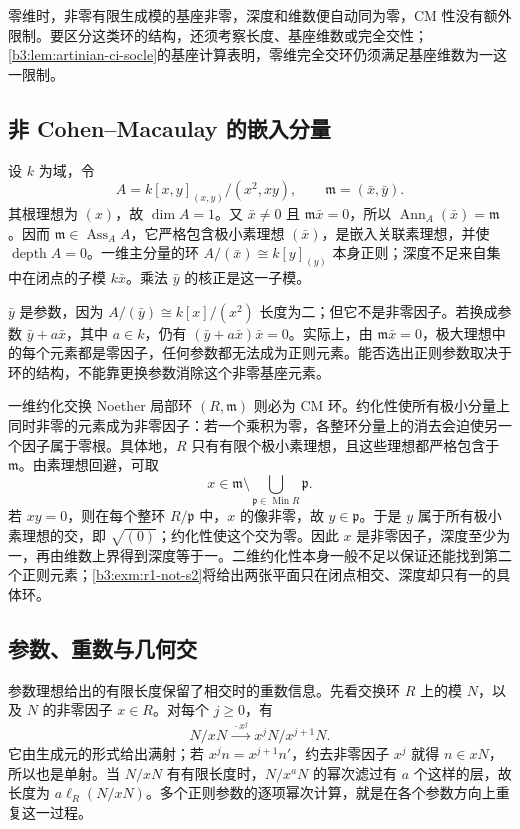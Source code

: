 零维时，非零有限生成模的基座非零，深度和维数便自动同为零，CM 性没有额外限制。要区分这类环的结构，还须考察长度、基座维数或完全交性；\cref{b3:lem:artinian-ci-socle}的基座计算表明，零维完全交环仍须满足基座维数为一这一限制。

\subsection{非 Cohen–Macaulay 的嵌入分量}
\label{b3:subsec:1904:02}

设 \(k\) 为域，令
\[
	A=k[x,y]_{(x,y)}/(x^2,xy),\qquad\mathfrak m=(\bar x,\bar y).
\]
其根理想为 \((x)\)，故 \(\dim A=1\)。又 \(\bar x\ne0\) 且 \(\mathfrak m\bar x=0\)，所以 \(\operatorname{Ann}_A(\bar x)=\mathfrak m\)。因而 \(\mathfrak m\in\operatorname{Ass}_AA\)，它严格包含极小素理想 \((\bar x)\)，是嵌入关联素理想，并使 \(\operatorname{depth}A=0\)。一维主分量的环 \(A/(\bar x)\cong k[y]_{(y)}\) 本身正则；深度不足来自集中在闭点的子模 \(k\bar x\)。乘法 \(\bar y\) 的核正是这一子模。

\ProseParagraphBreak
\(\bar y\) 是参数，因为 \(A/(\bar y)\cong k[x]/(x^2)\) 长度为二；但它不是非零因子。若换成参数 \(\bar y+a\bar x\)，其中 \(a\in k\)，仍有 \((\bar y+a\bar x)\bar x=0\)。实际上，由 \(\mathfrak m\bar x=0\)，极大理想中的每个元素都是零因子，任何参数都无法成为正则元素。能否选出正则参数取决于环的结构，不能靠更换参数消除这个非零基座元素。

\ProseParagraphBreak
一维约化交换 Noether 局部环 \((R,\mathfrak m)\) 则必为 CM 环。约化性使所有极小分量上同时非零的元素成为非零因子：若一个乘积为零，各整环分量上的消去会迫使另一个因子属于零根。具体地，\(R\) 只有有限个极小素理想，且这些理想都严格包含于 \(\mathfrak m\)。由素理想回避，可取
\[
	x\in\mathfrak m\setminus \bigcup_{\mathfrak p\in\operatorname{Min}R}\mathfrak p.
\]
若 \(xy=0\)，则在每个整环 \(R/\mathfrak p\) 中，\(x\) 的像非零，故 \(y\in\mathfrak p\)。于是 \(y\) 属于所有极小素理想的交，即 \(\sqrt{(0)}\)；约化性使这个交为零。因此 \(x\) 是非零因子，深度至少为一，再由维数上界得到深度等于一。二维约化性本身一般不足以保证还能找到第二个正则元素；\cref{b3:exm:r1-not-s2}将给出两张平面只在闭点相交、深度却只有一的具体环。

\subsection{参数、重数与几何交}
\label{b3:subsec:1904:03}

参数理想给出的有限长度保留了相交时的重数信息。先看交换环 \(R\) 上的模 \(N\)，以及 \(N\) 的非零因子 \(x\in R\)。对每个 \(j\ge0\)，有
\[
	N/xN\xrightarrow{\ \cdot x^j\ }x^jN/x^{j+1}N.
\]
它由生成元的形式给出满射；若 \(x^jn=x^{j+1}n'\)，约去非零因子 \(x^j\) 就得 \(n\in xN\)，所以也是单射。当 \(N/xN\) 有有限长度时，\(N/x^aN\) 的幂次滤过有 \(a\) 个这样的层，故长度为 \(a\ell_R(N/xN)\)。多个正则参数的逐项幂次计算，就是在各个参数方向上重复这一过程。

